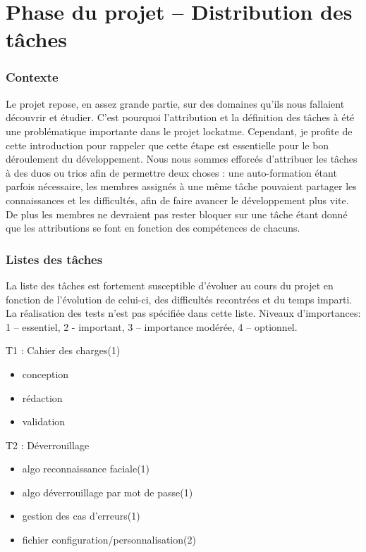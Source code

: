 \part{Phase du projet -- Distribution des tâches}
\section{Contexte}
Le projet repose, en assez grande partie, sur des domaines qu’ils nous
fallaient découvrir et étudier. C’est pourquoi l’attribution et la définition
des tâches à été une problématique importante dans le projet lockatme.
Cependant, je profite de cette introduction pour rappeler que cette étape est
essentielle pour le bon déroulement du développement. Nous nous sommes efforcés
d’attribuer les tâches à des duos ou trios afin de permettre deux choses : une
auto-formation étant parfois nécessaire, les membres assignés à une même tâche
pouvaient partager les connaissances et les difficultés, afin de faire avancer
le développement plus vite. De plus les membres ne devraient pas rester bloquer
sur une tâche étant donné que les attributions se font en fonction des
compétences de chacuns.

\section{Listes des tâches}
La liste des tâches est fortement susceptible d’évoluer au cours du projet en
fonction de l’évolution de celui-ci, des difficultés recontrées et du temps
imparti. La réalisation des tests n’est pas spécifiée dans cette liste.
Niveaux d’importances: 1 – essentiel, 2 - important, 3 – importance modérée,
4 – optionnel.

\vspace {0.5cm}

T1 : Cahier des charges(1)
\begin{itemize}
  \item{conception}
  \item{rédaction}
  \item{validation}
\end{itemize}

T2 : Déverrouillage
\begin{itemize}
  \item{algo reconnaissance faciale(1)}
  \item{algo déverrouillage par mot de passe(1)}
  \item{gestion des cas d’erreurs(1)}
  \item{fichier configuration/personnalisation(2)}
\end{itemize}

